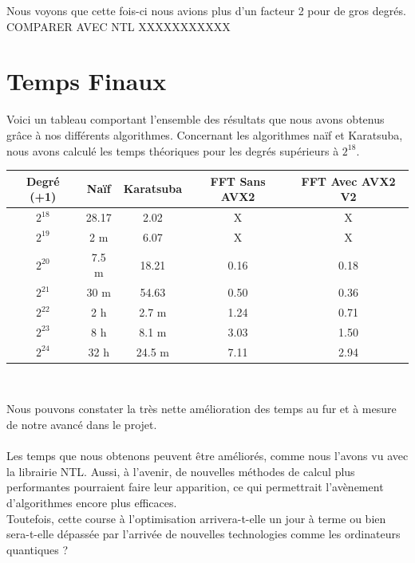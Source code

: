 \documentclass[12pt, a4paper]{article}
\begin{document}

\indent Nous voyons que cette fois-ci nous avions plus d'un facteur 2 pour de gros degrés. COMPARER AVEC NTL XXXXXXXXXXX

\newpage

\section{Temps Finaux}

Voici un tableau comportant l'ensemble des résultats que nous avons obtenus grâce à nos différents algorithmes.
Concernant les algorithmes naïf et Karatsuba, nous avons calculé les temps théoriques pour les degrés supérieurs à $2^{18}$. 

\begin{center}
\begin{tabular}{||c c c c c||}
\hline
Degré (+1) & Naïf & Karatsuba & FFT Sans AVX2 & FFT Avec AVX2 V2 \\
\hline\hline
$2^{18}$ & 28.17 & 2.02 & X & X \\
\hline
$2^{19}$ & 2 m & 6.07 & X & X \\
\hline
$2^{20}$ & 7.5 m & 18.21 & 0.16 & 0.18 \\
\hline
$2^{21}$ & 30 m & 54.63 & 0.50 & 0.36 \\
\hline
$2^{22}$ & 2 h & 2.7 m & 1.24 & 0.71 \\
\hline
$2^{23}$ & 8 h & 8.1 m & 3.03 & 1.50 \\
\hline
$2^{24}$ & 32 h & 24.5 m & 7.11 & 2.94 \\
\hline
\end{tabular}
\end{center}
{}
\ \\

\indent Nous pouvons constater la très nette amélioration des temps au fur et à mesure de notre avancé dans le projet. \\ \\
\indent Les temps que nous obtenons peuvent être améliorés, comme nous l'avons vu avec la librairie NTL. Aussi, à l'avenir, de nouvelles méthodes de calcul plus performantes pourraient faire leur apparition, ce qui permettrait l'avènement d'algorithmes encore plus efficaces. \\
Toutefois, cette course à l'optimisation arrivera-t-elle un jour à terme ou bien sera-t-elle dépassée par l'arrivée de nouvelles technologies comme les ordinateurs quantiques ?

\newpage



\end{document}
